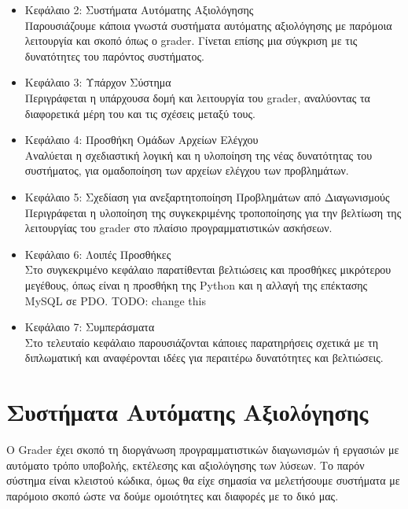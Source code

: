 \documentclass[diploma]{softlab-thesis}
\begin{document}
\begin{itemize}
  \item Κεφάλαιο 2: Συστήματα Αυτόματης Αξιολόγησης \\
    Παρουσιάζουμε κάποια γνωστά συστήματα αυτόματης αξιολόγησης με παρόμοια
    λειτουργία και σκοπό όπως ο grader. Γίνεται επίσης μια σύγκριση με τις
    δυνατότητες του παρόντος συστήματος.
  \item Κεφάλαιο 3: Υπάρχον Σύστημα \\
    Περιγράφεται η υπάρχουσα δομή και λειτουργία του grader, αναλύοντας τα
    διαφορετικά μέρη του και τις σχέσεις μεταξύ τους.
  \item Κεφάλαιο 4: Προσθήκη Ομάδων Αρχείων Ελέγχου \\
    Αναλύεται η σχεδιαστική λογική και η υλοποίηση της νέας δυνατότητας του
    συστήματος, για ομαδοποίηση των αρχείων ελέγχου των προβλημάτων.
  \item Κεφάλαιο 5: Σχεδίαση για ανεξαρτητοποίηση Προβλημάτων από Διαγωνισμούς \\
    Περιγράφεται η υλοποίηση της συγκεκριμένης τροποποίησης για την βελτίωση της
    λειτουργίας του grader στο πλαίσιο προγραμματιστικών ασκήσεων.
  \item Κεφάλαιο 6: Λοιπές Προσθήκες \\
    Στο συγκεκριμένο κεφάλαιο παρατίθενται βελτιώσεις και προσθήκες μικρότερου
    μεγέθους, όπως είναι η προσθήκη της Python και η αλλαγή της επέκτασης
    MySQL σε PDO.
    TODO: change this
  \item Κεφάλαιο 7: Συμπεράσματα \\
    Στο τελευταίο κεφάλαιο παρουσιάζονται κάποιες παρατηρήσεις σχετικά με τη
    διπλωματική και αναφέρονται ιδέες για περαιτέρω δυνατότητες και βελτιώσεις.
\end{itemize}


\chapter{Συστήματα Αυτόματης Αξιολόγησης}

Ο Grader έχει σκοπό τη διοργάνωση προγραμματιστικών διαγωνισμών ή εργασιών
με αυτόματο τρόπο υποβολής, εκτέλεσης και αξιολόγησης των λύσεων. Το παρόν
σύστημα είναι κλειστού κώδικα, όμως θα είχε σημασία να μελετήσουμε συστήματα
με παρόμοιο σκοπό ώστε να δούμε ομοιότητες και διαφορές με το δικό μας.

\bigskip
\end{document}
